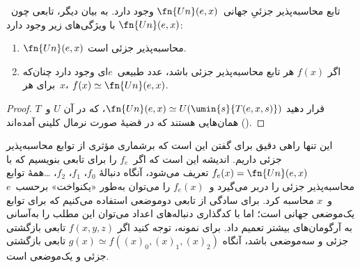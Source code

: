 \documentclass[../../../include/open-logic-section]{subfiles}
\begin{document}

\begin{thm}
تابع محاسبه‌پذیر جزئیِ جهانی~$\fn{Un}(e,x)$ وجود دارد. به بیان دیگر،
تابعی چون~$\fn{Un}(e,x)$ با ویژگی‌های زیر وجود دارد:
\begin{enumerate}
\item $\fn{Un}(e,x)$ محاسبه‌پذیر جزئی است.
\item اگر $f(x)$ هر تابع محاسبه‌پذیر جزئی باشد، عدد طبیعی~$e$ای وجود
دارد چنان‌که برای هر~$x$،
$f(x) \simeq \fn{Un}(e,x)$.
\end{enumerate}
\end{thm}

\begin{proof}
قرار دهید $\fn{Un}(e,x) \simeq U(\umin{s}{T(e,x,s)})$، که در آن
$U$ و~$T$ همان‌هایی هستند که در قضیهٔ صورت نرمال کلینی آمده‌اند
().
\end{proof}

\begin{explain}
این تنها راهی دقیق برای گفتن این است که برشماری مؤثری از توابع
محاسبه‌پذیر جزئی داریم. اندیشه این است که اگر~$f_e$ را برای تابعی
بنویسیم که با $f_e(x)=\fn{Un}(e,x)$ تعریف می‌شود، آنگاه دنبالهٔ
$f_0$، $f_1$، $f_2$، \dots همهٔ توابع محاسبه‌پذیر جزئی را دربر
می‌گیرد و~$f_e(x)$ را می‌توان به‌طور «یکنواخت» برحسب~$e$ و~$x$
محاسبه کرد. برای سادگی از تابعی دوموضعی استفاده می‌کنیم که برای توابع
یک‌موضعی جهانی است؛ اما با کدگذاری دنباله‌های اعداد می‌توان این مطلب
را به‌آسانی به آرگومان‌های بیشتر تعمیم داد. برای نمونه، توجه کنید اگر
$f(x,y,z)$ تابعی بازگشتی جزئی و سه‌موضعی باشد، آنگاه
$g(x) \simeq f((x)_0,(x)_1,(x)_2)$ تابعی بازگشتی جزئی و یک‌موضعی است.
\end{explain}
\end{document}
